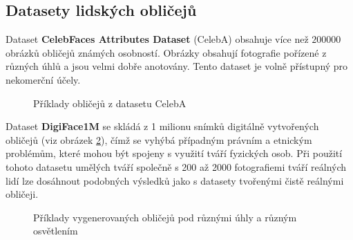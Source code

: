 \subsection*{Datasety lidských obličejů}
Dataset \textbf{CelebFaces Attributes Dataset} (CelebA) \cite{celebA} obsahuje více než $200 000$ obrázků obličejů známých osobností. Obrázky obsahují fotografie pořízené z různých úhlů a jsou velmi dobře anotovány. Tento dataset je volně přístupný pro nekomerční účely.

\begin{figure}[H]
  \begin{center}
  \label{obrazek:celeba}
  \caption{Příklady obličejů z datasetu CelebA}
  \end{center}
\end{figure}

Dataset \textbf{DigiFace1M} \cite{digiface1m} se skládá z 1 milionu snímků digitálně vytvořených obličejů (viz obrázek \ref{obrazek:digiface}), čímž se vyhýbá případným právním a etnickým problémům, které mohou být spojeny s využití tváří fyzických osob. Při použití tohoto datasetu umělých tváří společně s 200 až 2000 fotografiemi tváří reálných lidí lze dosáhnout podobných výsledků jako s datasety tvořenými čistě reálnými obličeji.

\begin{figure}[H]
  \begin{center}
  \label{obrazek:digiface}
  \caption{Příklady vygenerovaných obličejů pod různými úhly a různým osvětlením \cite{digiface1m}}
  \end{center}
\end{figure}

